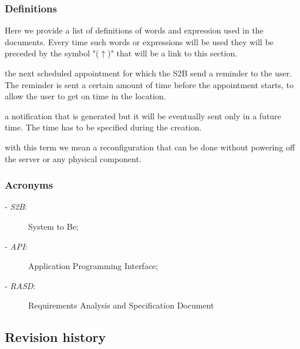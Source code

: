 	\subsubsection{Definitions}
	\label{definitions}
	Here we provide a list of definitions of words and expression used in the documents. Every time such words or expressions will be used they will be preceded by the symbol "($\uparrow$)" that will be a link to this section.
	\begin{description}[before={\renewcommand{\makelabel}[1]{-- \textbf{\textit{##1}}:}}]
		\item[Incoming Appointment] the next scheduled appointment for which the S2B send a reminder to the user. The reminder is sent  a certain amount of time before the appointment starts, to allow the user to get on time in the location.
		\item[Future Notification] a notification that is generated but it will be eventually sent only in a future time. The time has to be specified during the creation.
		\item[Dynamic Configuration] with this term we mean a reconfiguration that can be done without powering off the server or any physical component.
	\end{description}
	\subsubsection{Acronyms}
			\begin{description}
		\item[- \textit{S2B}:] System to Be;
		\item[- \textit{API}:] Application Programming Interface;
		\item[- \textit{RASD}:] Requirements Analysis and Specification Document
	\end{description}
	
\subsection{Revision history}
	
